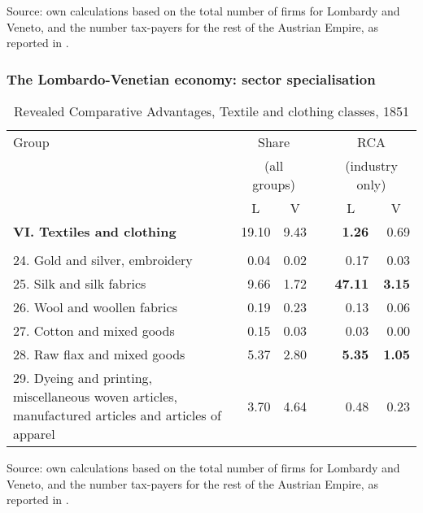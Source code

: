 \documentclass[10pt]{beamer}
\begin{document}
\begin{frame}
\begin{table}[htbp]
    Source: own calculations based on the total number of firms for Lombardy and Veneto, and the number tax-payers for the rest of the Austrian Empire, as reported in \cite{mittheilungen1855}.

\end{table}%

\end{frame}

\begin{frame}
    \frametitle{The Lombardo-Venetian economy: sector specialisation}

\begin{table}[htbp]
  \centering
  \fontsize{8}{8}\selectfont
  \caption{Revealed Comparative Advantages, Textile and clothing classes, 1851}
    \begin{tabular}{p{5cm}rrrrr}
    \hline
    Group & \multicolumn{2}{c}{Share} &   & \multicolumn{2}{c}{RCA} \\
     & \multicolumn{2}{c}{(all groups)} &   & \multicolumn{2}{c}{(industry only)} \\
\cline{2-3}\cline{5-6}      & \multicolumn{1}{c}{L} & \multicolumn{1}{c}{V} &   & \multicolumn{1}{c}{L} & \multicolumn{1}{c}{V}\\
    \hline
    \textbf{VI. Textiles and clothing} & 19.10 & 9.43  &   & \multicolumn{1}{r}{\textbf{1.26}} & \multicolumn{1}{r}{0.69} \\
    \\
    24. Gold and silver, embroidery & 0.04 & 0.02 &   & 0.17 & 0.03 \\ %
    25. Silk and silk fabrics & 9.66 & 1.72 &   & \textbf{47.11} & \textbf{3.15} \\
    26. Wool and woollen fabrics & 0.19 & 0.23 &   & 0.13 & 0.06 \\
    27. Cotton and mixed goods & 0.15 & 0.03 &   & 0.03 & 0.00 \\ %
    28. Raw flax and mixed goods & 5.37 & 2.80 &   & \textbf{5.35} & \textbf{1.05} \\ %
    29. Dyeing and printing, miscellaneous woven articles, manufactured articles and articles of apparel & 3.70 & 4.64 &   & 0.48 & 0.23 \\
    \hline
    \end{tabular}%
  \label{tab:rca_textiles}%

    Source: own calculations based on the total number of firms for Lombardy and Veneto, and the number tax-payers for the rest of the Austrian Empire, as reported in \cite{mittheilungen1855}.


\end{table}
\end{frame}
\end{document}
